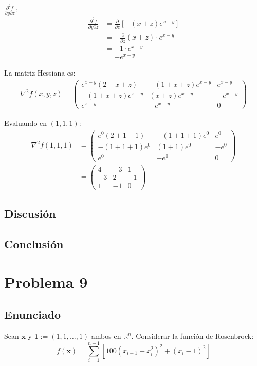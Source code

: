 \documentclass{article}
\begin{document}
$\frac{\partial^2 f}{\partial y \partial z}$:
\begin{align}
\frac{\partial^2 f}{\partial y \partial z} &= \frac{\partial}{\partial z}[-(x + z)e^{x-y}] \\
&= -\frac{\partial}{\partial z}(x + z) \cdot e^{x-y} \\
&= -1 \cdot e^{x-y} \\
&= -e^{x-y}
\end{align}

La matriz Hessiana es:
\begin{align}
\nabla^2 f(x,y,z) = \begin{pmatrix}
e^{x-y}(2 + x + z) & -(1 + x + z)e^{x-y} & e^{x-y} \\
-(1 + x + z)e^{x-y} & (x + z)e^{x-y} & -e^{x-y} \\
e^{x-y} & -e^{x-y} & 0
\end{pmatrix}
\end{align}

Evaluando en $(1, 1, 1)$:
\begin{align}
\nabla^2 f(1,1,1) &= \begin{pmatrix}
e^0(2 + 1 + 1) & -(1 + 1 + 1)e^0 & e^0 \\
-(1 + 1 + 1)e^0 & (1 + 1)e^0 & -e^0 \\
e^0 & -e^0 & 0
\end{pmatrix} \\
&= \begin{pmatrix}
4 & -3 & 1 \\
-3 & 2 & -1 \\
1 & -1 & 0
\end{pmatrix}
\end{align}

\subsection{Discusión}

\subsection{Conclusión}

\section{Problema 9}

\subsection{Enunciado}
Sean $\mathbf{x}$ y $\mathbf{1} := (1, 1, \ldots, 1)$ ambos en $\mathbb{R}^n$. Considerar la función de Rosenbrock:
$$f(\mathbf{x}) = \sum_{i=1}^{n-1} \left[100(x_{i+1} - x_i^2)^2 + (x_i - 1)^2\right]$$
\end{document}
